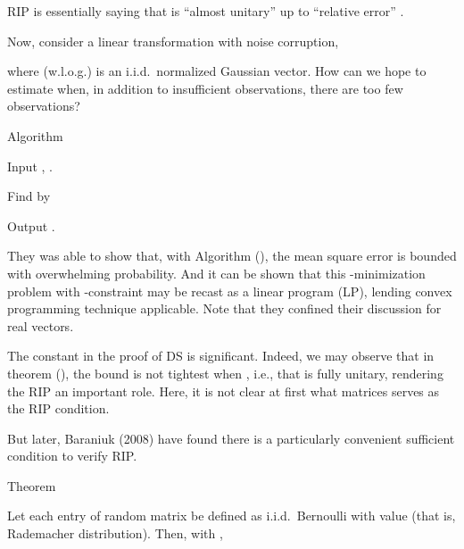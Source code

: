 RIP is essentially saying that  is ``almost unitary'' up to ``relative error'' .

Now, consider a linear transformation with noise corruption,


where (w.l.o.g.)  is an i.i.d.\ normalized Gaussian vector.
How can we hope to estimate  when, in addition to insufficient observations, there are too few observations?

\Result
{Algorithm}
{
\startitemize[n]
\item Input , .
\item Find  by
\item Output .
}

They was able to show that, with Algorithm (), the mean square error is bounded with overwhelming probability.
And it can be shown that this -minimization problem with \m {\ell_\infty}-constraint may be recast as a linear program (LP), lending convex programming technique applicable.
Note that they confined their discussion for real vectors.

\stopsection
\startsection [title={Sufficient Conditions of RIP}]

The constant \m {\d} in the proof of DS is significant.
Indeed, we may observe that in theorem (), the bound is not tightest when , i.e., that  is fully unitary, rendering the RIP an important role.
Here, it is not clear at first what matrices serves as the RIP condition.

But later, Baraniuk (2008) have found there is a particularly convenient sufficient condition to verify RIP.

\Result
{Theorem}
{
Let each entry of random matrix  be defined as i.i.d.\ Bernoulli with value  (that is, Rademacher distribution).
Then, with ,

}

